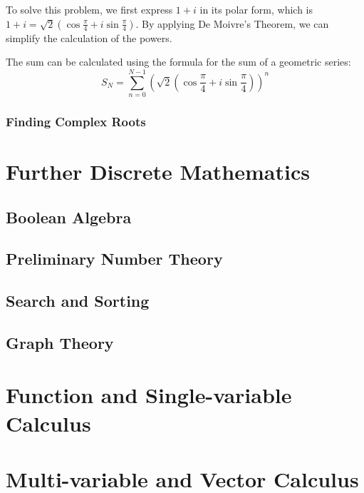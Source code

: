 \documentclass[
	12pt, %
	fleqn, %
	a4paper, %
]{LegrandOrangeBook}
\begin{document}
                    To solve this problem, we first express \(1 + i\) in its polar form, which is \(1 + i = \sqrt{2}(\cos \frac{\pi}{4} + i\sin \frac{\pi}{4})\). By applying De Moivre's Theorem, we can simplify the calculation of the powers.

                    The sum can be calculated using the formula for the sum of a geometric series:
                    \[ S_N = \sum_{n=0}^{N-1} (\sqrt{2}(\cos \frac{\pi}{4} + i\sin \frac{\pi}{4}))^n \] 
\section{Finding Complex Roots}
\part{Further Discrete Mathematics}


\chapterspaceabove{6.75cm} 
\chapterspacebelow{7.25cm} 
\chapter{Boolean Algebra}

\chapterspaceabove{6.75cm} 
\chapterspacebelow{7.25cm} 
\chapter{Preliminary Number Theory}
\chapterspaceabove{6.75cm} 
\chapterspacebelow{7.25cm} 
\chapter{Search and Sorting}
\chapterspaceabove{6.75cm} 
\chapterspacebelow{7.25cm} 
\chapter{Graph Theory}

\part{Function and Single-variable Calculus}
\part{Multi-variable and Vector Calculus}
\end{document}
